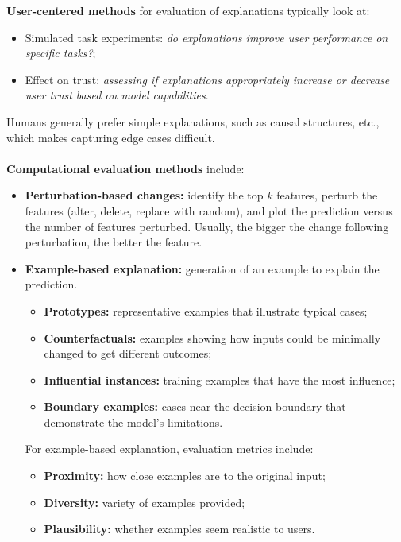 \documentclass[a4paper,11pt]{article}
\begin{document}
\textbf{User-centered methods} for evaluation of explanations typically look at:
\begin{itemize}
    \item   Simulated task experiments: \textit{do explanations improve user performance on specific tasks?};
    \item   Effect on trust: \textit{assessing if explanations appropriately increase or decrease user trust based on model capabilities}.
\end{itemize}

Humans generally prefer simple explanations, such as causal structures, etc., which makes capturing edge cases difficult.
\\\\
\textbf{Computational evaluation methods} include:
\begin{itemize}
    \item   \textbf{Perturbation-based changes:} identify the top $k$ features, perturb the features (alter, delete, replace with random), and plot the prediction versus the number of features perturbed.
            Usually, the bigger the change following perturbation, the better the feature.

    \item   \textbf{Example-based explanation:} generation of an example to explain the prediction.
            \begin{itemize}
                \item   \textbf{Prototypes:} representative examples that illustrate typical cases;
                \item   \textbf{Counterfactuals:} examples showing how inputs could be minimally changed to get different outcomes;
                \item   \textbf{Influential instances:} training examples that have the most influence;
                \item   \textbf{Boundary examples:} cases near the decision boundary that demonstrate the model's limitations.
            \end{itemize}

            For example-based explanation, evaluation metrics include:
            \begin{itemize}
                \item   \textbf{Proximity:} how close examples are to the original input;
                \item   \textbf{Diversity:} variety of examples provided;
                \item   \textbf{Plausibility:} whether examples seem realistic to users.
            \end{itemize}


\end{itemize}
\end{document}
